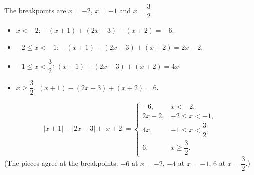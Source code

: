 The breakpoints are $x=-2$, $x=-1$ and $x=\dfrac{3}{2}$.
\begin{itemize}
\item $x<-2$: $-(x+1)+(2x-3)-(x+2)=-6$.
\item $-2\le x<-1$: $-(x+1)+(2x-3)+(x+2)=2x-2$.
\item $-1\le x<\dfrac{3}{2}$: $(x+1)+(2x-3)+(x+2)=4x$.
\item $x\ge\dfrac{3}{2}$: $(x+1)-(2x-3)+(x+2)=6$.
\end{itemize}
\[
\boxed{|x+1|-|2x-3|+|x+2|=\begin{cases}-6,&x<-2,\\ 2x-2,&-2\le x<-1,\\ 4x,&-1\le x<\dfrac{3}{2},\\ 6,&x\ge\dfrac{3}{2}.\end{cases}}
\]
(The pieces agree at the breakpoints: $-6$ at $x=-2$, $-4$ at $x=-1$, $6$ at $x=\dfrac{3}{2}$.)
